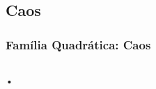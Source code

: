 \subsection{Caos}

\begin{frame}
\vspace{5pt}
\frametitle{Família Quadrática: Caos}
\begin{columns}
\column{\dimexpr\paperwidth-15pt}

•

\end{columns}
\end{frame}

